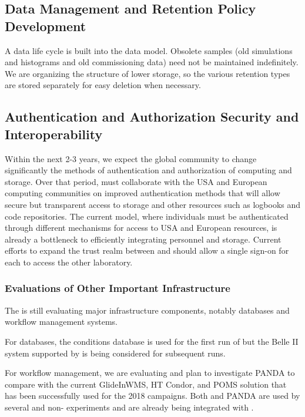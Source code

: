 \subsection{Data Management and Retention Policy Development}



A data life cycle is built into the  data model.  Obsolete samples (old simulations and histograms and old commissioning data) need not be maintained indefinitely.  
We are organizing the structure of lower storage, so the various retention types are stored separately for easy deletion when necessary.  

\subsection{Authentication and Authorization Security and Interoperability}\label{ch-comp-auth}

Within the next 2-3 years, we expect the global  community to change significantly the methods of authentication and authorization of computing and storage. 
Over that period,  must collaborate with the USA and European  computing communities on improved authentication methods  that will allow secure but transparent access to storage and other resources such as logbooks and code repositories.  The current model, where individuals must be authenticated through different mechanisms for access to USA and European resources, is already a bottleneck to efficiently integrating personnel and storage. 
Current efforts to expand the trust realm between  and  should allow a single sign-on for each to access the other laboratory.


\subsubsection{Evaluations of Other Important Infrastructure}

The   is still evaluating major infrastructure components, notably databases and workflow management systems.

For databases\cite{Laycock:2019ynk}, the  conditions database is used for the first run of  but the Belle II\cite{Ritter:2018jxh} system supported by  is being considered for subsequent runs. 

For workflow management, we are evaluating \cite{Falabella:2016waj} and plan to investigate PANDA\cite{Megino:2017ywl} to compare with the current GlideInWMS, HT Condor, and POMS solution that has been successfully used for the 2018  campaigns.
Both  and PANDA are used by several  and non- experiments and are already being integrated with . 


